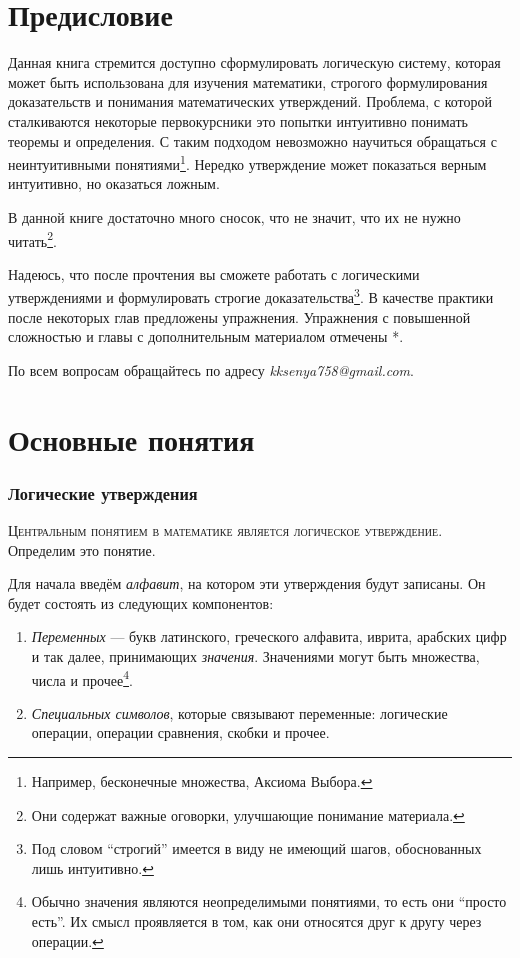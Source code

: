 \part{Предисловие}

Данная книга стремится доступно сформулировать логическую систему,
которая может быть использована для изучения математики, строгого
формулирования доказательств и понимания математических утверждений.
Проблема, с которой сталкиваются некоторые первокурсники это попытки
интуитивно понимать теоремы и определения. С таким подходом невозможно
научиться обращаться с неинтуитивными
понятиями\footnote{Например, бесконечные множества, Аксиома Выбора.}.
Нередко утверждение может показаться верным интуитивно,
но оказаться ложным.

В данной книге достаточно много сносок, что не значит, что их
не нужно читать\footnote{Они содержат важные оговорки,
	улучшающие понимание материала.}.

Надеюсь, что после прочтения вы сможете работать с логическими
утверждениями и формулировать строгие доказательства\footnote{Под словом ``строгий''
	имеется в виду не имеющий шагов, обоснованных лишь интуитивно.}. В качестве практики
после некоторых глав предложены упражнения. Упражнения с повышенной сложностью
и главы с дополнительным материалом отмечены *.

По всем вопросам обращайтесь по адресу {\sl kksenya758@gmail.com}.

\part{Основные понятия}

\section{Логические утверждения}

\textsc{Центральным понятием в математике является логическое утверждение.}
Определим это понятие.

Для начала введём {\it алфавит}, на котором эти утверждения будут записаны.
Он будет состоять из следующих компонентов:
\begin{enumerate}
	\item{}{\it Переменных} --- букв латинского, греческого алфавита,
	иврита, арабских цифр и так далее, принимающих {\it значения}.
	Значениями могут быть множества, числа и прочее\footnote{Обычно значения
		являются неопределимыми понятиями, то есть они ``просто есть''. Их смысл
		проявляется в том, как они относятся друг к другу через операции.}.
	\item{}{\it Специальных символов}, которые связывают переменные:
	логические операции, операции сравнения, скобки и прочее.
\end{enumerate}

